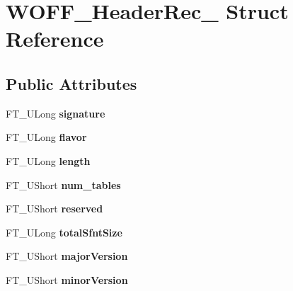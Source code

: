 \hypertarget{structWOFF__HeaderRec__}{}\section{W\+O\+F\+F\+\_\+\+Header\+Rec\+\_\+ Struct Reference}
\label{structWOFF__HeaderRec__}
\subsection*{Public Attributes}
\begin{DoxyCompactItemize}
\item 
\mbox{\label{structWOFF__HeaderRec___a4ecfcefa20b9b5c897d82727293e7111}} 
F\+T\+\_\+\+U\+Long {\bfseries signature}
\item 
\mbox{\label{structWOFF__HeaderRec___ac805e897e024bfe4cd363f09138e2a5a}} 
F\+T\+\_\+\+U\+Long {\bfseries flavor}
\item 
\mbox{\label{structWOFF__HeaderRec___a7cade0fd6f387b1e618804af7d113c6a}} 
F\+T\+\_\+\+U\+Long {\bfseries length}
\item 
\mbox{\label{structWOFF__HeaderRec___a50c23865dcbfe3521af337bb54f68b01}} 
F\+T\+\_\+\+U\+Short {\bfseries num\+\_\+tables}
\item 
\mbox{\label{structWOFF__HeaderRec___a968e375e8e226a532ae19570b38da37c}} 
F\+T\+\_\+\+U\+Short {\bfseries reserved}
\item 
\mbox{\label{structWOFF__HeaderRec___af1ab5dfddb4318368b20d2542b284fc4}} 
F\+T\+\_\+\+U\+Long {\bfseries total\+Sfnt\+Size}
\item 
\mbox{\label{structWOFF__HeaderRec___a814bef54b9aedb973bec2ef4009a8031}} 
F\+T\+\_\+\+U\+Short {\bfseries major\+Version}
\item 
\mbox{\label{structWOFF__HeaderRec___a39532ac80b6d675eea62b8c2f586d9e3}} 
F\+T\+\_\+\+U\+Short {\bfseries minor\+Version}
\item 
\mbox{\label{structWOFF__HeaderRec___ac93e010ba26ba188d948009c089a824d}} 

\end{DoxyCompactItemize}
